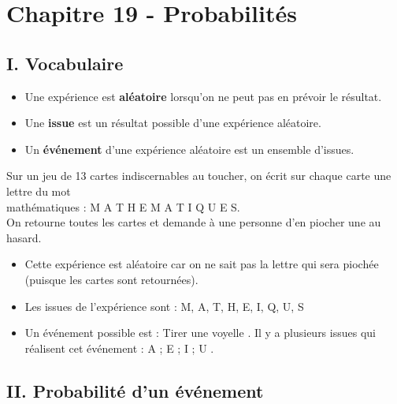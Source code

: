 \section*{Chapitre 19 - Probabilités}
 
\subsection*{I. Vocabulaire}

\begin{Définitions*}[c]
\leavevmode\vspace{-\baselineskip}
\begin{itemize}[label=\textcolor{Couleur6}{$\bullet$}]
\item Une expérience est \textbf{aléatoire} lorsqu'on ne peut pas en prévoir le résultat.
\item Une \textbf{issue} est un résultat possible d'une expérience aléatoire.
\item Un \textbf{événement} d'une expérience aléatoire est un ensemble d'issues.
\end{itemize}
\end{Définitions*}

\vspace{0.3cm}

\begin{Exemple}  Sur un jeu de 13 cartes indiscernables au toucher, on écrit sur chaque carte une lettre du mot \\
\og mathématiques \fg{} : M A T H E M A T I Q U E S. \\
On retourne toutes les cartes et demande à une personne d'en piocher une au hasard.
\begin{itemize}[label=\textcolor{Couleur8}{$\bullet$}]
\item Cette expérience est aléatoire car on ne sait pas la lettre qui sera piochée (puisque les cartes sont retournées).
\item Les issues de l'expérience sont : M, A, T, H, E, I, Q, U, S
\item Un événement possible est : \og Tirer une voyelle \fg{}. Il y a plusieurs issues qui réalisent cet événement : \og A ; E ; I ; U \fg{}.
\end{itemize}
\end{Exemple}


\subsection*{II. Probabilité d'un événement}

